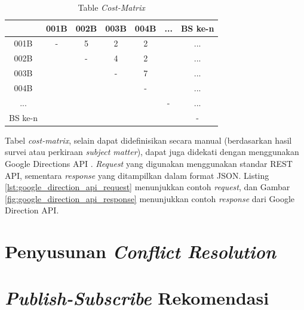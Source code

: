 \begin{table}[]
\centering
\caption{Table \textit{Cost-Matrix}}
\label{tbl:cost_matrix}
\begin{tabular}{@{}|c|c|c|c|c|c|c|@{}}
\toprule
        & 001B & 002B & 003B & 004B & ... & BS ke-n \\ \midrule
001B    & -    & 5    & 2    & 2    &     & ...     \\ \midrule
002B    &      & -    & 4    & 2    &     & ...     \\ \midrule
003B    &      &      & -    & 7    &     & ...     \\ \midrule
004B    &      &      &      & -    &     & ...     \\ \midrule
...     &      &      &      &      & -   & ...     \\ \midrule
BS ke-n &      &      &      &      &     & -       \\ \bottomrule
\end{tabular}
\end{table}


Tabel \textit{cost-matrix}, selain dapat didefinisikan secara manual (berdasarkan hasil survei atau perkiraan \textit{subject matter}), dapat juga didekati dengan menggunakan Google Directions API \citep{google_google_2016}. \textit{Request} yang digunakan menggunakan standar REST API, sementara \textit{response} yang ditampilkan dalam format JSON. Listing \ref{lst:google_direction_api_request} menunjukkan contoh \textit{request}, dan Gambar \ref{fig:google_direction_api_response} menunjukkan contoh \textit{response} dari Google Direction API.








%
%


\section{Penyusunan \textit{Conflict Resolution}}


\section{\textit{Publish-Subscribe} Rekomendasi}
